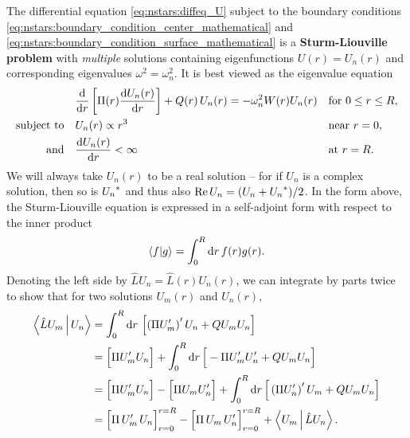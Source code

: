 The differential equation \eqref{eq:nstars:diffeq_U} subject to the boundary conditions \eqref{eq:nstars:boundary_condition_center_mathematical} and \eqref{eq:nstars:boundary_condition_surface_mathematical} is a \textbf{Sturm-Liouville problem} with \emph{multiple} solutions containing eigenfunctions $U(r) = U_n(r)$ and corresponding eigenvalues $\omega^2 = \omega_n^2$.
It is best viewed as the eigenvalue equation
\begin{subequations}
\begin{align}
	&\odv*{ \left[ \Pi(r) \odv{U_n(r)}{r} \right] }{r} + Q(r) \, U_n(r) = -\omega_n^2 W(r) U_n(r) && \text{for } 0 \leq r \leq R , \label{eq:nstars:sturm_liouville} \\
	\text{subject to} \quad & U_n(r)          \propto r^3    && \text{near } r=0 , \label{eq:nstars:sturm_liouville_boundary_condition1} \\
	\text{and}        \quad & \odv{U_n(r)}{r} <       \infty && \text{at } r=R . \label{eq:nstars:sturm_liouville_boundary_condition2}
\end{align}%
\label{eq:nstars:sturm_liouville_problem}%
\end{subequations}
We will always take $U_n(r)$ to be a real solution -- for if $U_n$ is a complex solution, then so is ${U_n}^*$ and thus also $\operatorname{Re}{U_n} = (U_n + {U_n}^*)/2$.
In the form above, the Sturm-Liouville equation is expressed in a self-adjoint form with respect to the inner product
\begin{equation}
	\braket{f | g} = \int_0^R \mathop{}\!\mathrm{d} r \, f(r) g(r) .
\label{eq:nstars:function_inner_product}
\end{equation}
Denoting the left side by $\hat{L} U_n = \hat{L}(r) U_n(r)$, we can integrate by parts twice to show that for two solutions $U_m(r)$ and $U_n(r)$,
\begin{equation}
\begin{split}
	\Braket{\hat{L} U_m | U_n} &= \int_0^R \mathop{}\!\mathrm{d} r \, \left[ \left( \Pi U_m' \right)' U_n + Q U_m U_n \right] \\
	                           &= \Big[ \Pi U_m' U_n \Big] + \int_0^R \mathop{}\!\mathrm{d} r \, \Big[ - \Pi U_m' U_n' + Q U_m U_n \Big] \\
	                           &= \Big[ \Pi U_m' U_n \Big] - \Big[ \Pi U_m U_n' \Big] + \int_0^R \mathop{}\!\mathrm{d} r \, \Big[ \left( \Pi U_n' \right)' U_m + Q U_m U_n \Big] \\
	                           &= \Big[ \Pi \, U_m' \, U_n \Big]_{r=0}^{r=R} - \Big[ \Pi \, U_m \, U_n' \Big]_{r=0}^{r=R} + \Braket{U_m | \hat{L} U_n} . \\
\end{split}
\end{equation}
